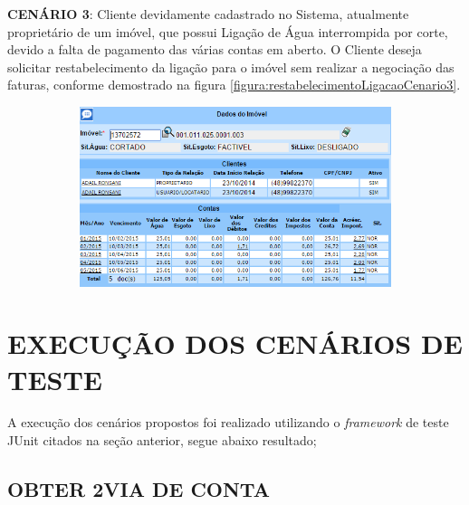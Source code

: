 \begin{flushleft}
	\begin{description}
		\item \textbf{CENÁRIO 3}: Cliente devidamente cadastrado no Sistema, atualmente proprietário de um imóvel, que possui Ligação de Água interrompida por corte, devido a falta de pagamento das várias contas em aberto. O Cliente deseja solicitar restabelecimento da ligação para o imóvel sem realizar a negociação das faturas, conforme demostrado na figura \ref{figura:restabelecimentoLigacaoCenario3}.
		\begin{figure}[H]
			\centering
			\caption{\textbf{Restabelecimento da Ligação de Água - Cenário de Teste 3}}
			\label{figura:restabelecimentoLigacaoCenario3}
			\begin{subfigure}[H]{\textwidth}
				\centering
				\includegraphics{figuras/cenarios/restabelecimento/cenario_3.PNG}
			\end{subfigure}
		\end{figure}
	\end{description}

\end{flushleft}	


\section{\textbf{\uppercase{Execução dos Cenários de Teste}}}


A execução dos cenários propostos foi realizado utilizando o \textit{framework} de teste JUnit citados na seção anterior, segue abaixo resultado; 

\subsection{\textbf{\uppercase{Obter 2\textordfeminine  \space Via de Conta}}}
 
